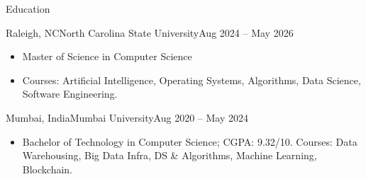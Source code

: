 \documentclass[]{mcdowellcv}
\begin{document}
\begin{cvsection}{Education}
  \begin{cvsubsection}{Raleigh, NC}{North Carolina State University}{Aug 2024 -- May 2026}
    \begin{itemize}
      \item Master of Science in Computer Science
      \item Courses: Artificial Intelligence, Operating Systems, Algorithms, Data Science, Software Engineering.
    \end{itemize}
    \vspace{-1.5pt}
  \end{cvsubsection}

  \begin{cvsubsection}{Mumbai, India}{Mumbai University}{Aug 2020 -- May 2024}
    \begin{itemize}
      \item Bachelor of Technology in Computer Science; CGPA: 9.32/10. Courses: Data Warehousing, Big Data Infra, DS \& Algorithms, Machine Learning, Blockchain.
    \end{itemize}
    \vspace{-1.5pt}
  \end{cvsubsection}
\end{cvsection}
\end{document}
